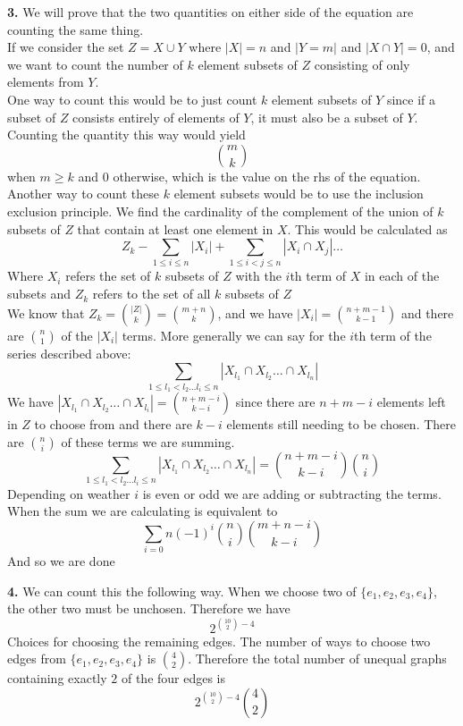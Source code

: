 \documentclass[12pt]{article}
\newenvironment{ques}{\vspace{2 ex}}{\vspace{2 ex}}
\theoremstyle{definition}
\begin{document}
\begin{ques}
	\textbf{3.} We will prove that the two quantities on either side of the
		equation are counting the same thing.\\
		If we consider the set $Z = X \cup Y$ where $|X| = n$ and $|Y =
		m|$ and $|X \cap Y| = 0$, and we want to count the number of
		$k$ element subsets of $Z$ consisting of only elements from $Y$.\\
		One way to count this would be to just count $k$ element
		subsets of $Y$ since if a subset of $Z$ consists entirely of
		elements of $Y$, it must also be a subset of $Y$. Counting the
		quantity this way would yield
		$$\binom{m}{k}$$
		when $m \geq k$ and $0$ otherwise, which is the value on the
		rhs of the equation.\\
		Another way to count these $k$ element subsets would be to use
		the inclusion exclusion principle. We find the cardinality of
		the complement of the union of $k$ subsets of $Z$ that contain at
		least one element in $X$. This would be calculated as
		$$Z_k - \sum_{1 \leq i \leq n} |X_i| + \sum_{1 \leq i < j \leq
		n}|X_i \cap X_j|\dots $$
		Where $X_i$ refers the set of $k$ subsets of $Z$ with the $i$th term
		of $X$ in each of the subsets and $Z_k$ refers to the set of
		all $k$ subsets of $Z$\\
		We know that $Z_k = \binom{|Z|}{k} = \binom{m + n}{k}$, and we
		have $|X_i| = \binom{n + m - 1}{k-1}$ and there are $\binom{n}{1}$ of
		the $|X_i|$ terms. More generally we can say for the $i$th term
		of the series described above: 
		$$\sum_{1 \leq l_1 < l_2 \dots l_i \leq n}|X_{l_1} \cap X_{l_2}
		\dots \cap X_{l_n}|$$
		We have $|X_{l_1} \cap X_{l_2} \dots \cap X_{l_i}| = \binom{n +
		m - i}{k - i}$ since there are $n+m - i $ elements left in $Z$ to
		choose from and there are $k - i$ elements still needing to be
		chosen. There are $\binom{n}{i}$ of these terms we are summing.
		$$\sum_{1 \leq l_1 < l_2 \dots l_i \leq n}|X_{l_1} \cap X_{l_2}
		\dots \cap X_{l_n}| = \binom{n + m - i}{k-i}\binom{n}{i}$$
		Depending on weather $i$ is even or odd we are adding or
		subtracting the terms. When the sum we are calculating is equivalent to 
		$$\sum_{i = 0}{n} (-1)^i\binom{n}{i}\binom{m+n - i}{k-i}$$
		And so we are done

\end{ques}

\begin{ques}
	\textbf{4.}
		We can count this the following way. When we choose two of
		$\{e_1, e_2, e_3, e_4\}$, the other two must be unchosen. Therefore we have
		$$2^{\binom{10}{2} - 4}$$
		Choices for choosing the remaining edges. The number of ways to
		choose two edges from $\{e_1, e_2, e_3, e_4\}$ is
		$\binom{4}{2}$. Therefore the total number of unequal graphs containing exactly $2$ of the four edges is 
		$$2^{\binom{10}{2} - 4}\binom{4}{2}$$
\end{ques}
\end{document}
